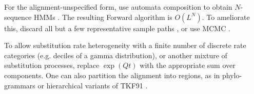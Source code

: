 \documentclass{article}
\begin{document}
For the alignment-unspecified form, use automata composition to obtain $N$-sequence HMMs \cite{SilvestreRyanEtAl2020}.
The resulting Forward algorithm is $O(L^N)$.
To ameliorate this, discard all but a few representative sample paths \cite{WestessonEtAl2012},
or use MCMC \cite{RedelingsSuchard2007}.

To allow substitution rate heterogeneity
with a finite number of discrete rate categories
(e.g. deciles of a gamma distribution),
or another mixture of substitution processes,
replace $\exp(Qt)$ with the appropriate sum over components.
One can also partition the alignment into regions, as in phylo-grammars \cite{KlostermanEtAl2006}
or hierarchical variants of TKF91 \cite{Holmes2004}.



\end{document}
